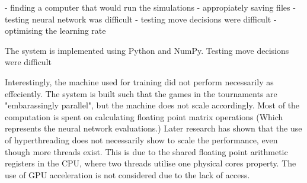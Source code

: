 \documentclass[12pt,a4paper]{article}
\begin{document}
        - finding a computer that would run the simulations
        - appropiately saving files
        - testing neural network was difficult
        - testing move decisions were difficult
        - optimising the learning rate

    The system is implemented using Python and NumPy.
    Testing move decisions were difficult
    

    Interestingly, the machine used for training did not perform necessarily as effeciently. The system is built such that the games in the tournaments are "embarassingly parallel", but the machine does not scale accordingly. Most of the computation is spent on calculating floating point matrix operations (Which represents the neural network evaluations.) 
    Later research has shown that the use of hyperthreading does not necessarily show to scale the performance, even though more threads exist. \cite{leng_empirical_2002} This is due to the shared floating point arithmetic registers in the CPU, where two threads utilise one physical cores property. The use of GPU acceleration is not considered due to the lack of access. 
    
\end{document}
